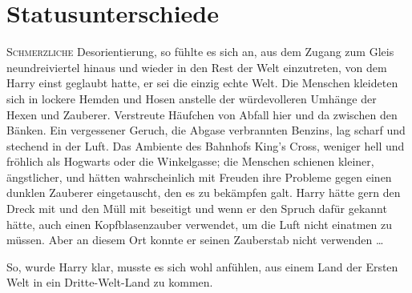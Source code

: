 \chapter{Statusunterschiede}

\lettrine{S}{chmerzliche} Desorientierung, so fühlte es sich an, aus dem Zugang zum Gleis neundreiviertel hinaus und wieder in den Rest der Welt einzutreten, von dem Harry einst geglaubt hatte, er sei die einzig echte Welt. Die Menschen kleideten sich in lockere Hemden und Hosen anstelle der würdevolleren Umhänge der Hexen und Zauberer. Verstreute Häufchen von Abfall hier und da zwischen den Bänken. Ein vergessener Geruch, die Abgase verbrannten Benzins, lag scharf und stechend in der Luft. Das Ambiente des Bahnhofs King’s Cross, weniger hell und fröhlich als Hogwarts oder die Winkelgasse; die Menschen schienen kleiner, ängstlicher, und hätten wahrscheinlich mit Freuden ihre Probleme gegen einen dunklen Zauberer eingetauscht, den es zu bekämpfen galt. Harry hätte gern den Dreck mit  und den Müll mit  beseitigt und wenn er den Spruch dafür gekannt hätte, auch einen Kopfblasenzauber verwendet, um die Luft nicht einatmen zu müssen. Aber an diesem Ort konnte er seinen Zauberstab nicht verwenden …

So, wurde Harry klar, musste es sich wohl anfühlen, aus einem Land der Ersten Welt in ein Dritte-Welt-Land zu kommen.

